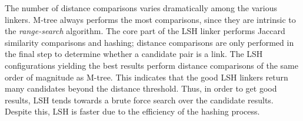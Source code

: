 \documentclass{llncs}
\begin{document}
The number of distance comparisons varies dramatically among the various
linkers. M-tree always performs the most comparisons, since they are
intrinsic to the \emph{range-search} algorithm. The core part of the LSH
linker performs Jaccard similarity comparisons and hashing; distance
comparisons are only performed in the final step to determine whether a
candidate pair is a link. The LSH configurations yielding the best
results perform distance comparisons of the same order of magnitude as
M-tree. This indicates that the good LSH linkers return many candidates
beyond the distance threshold. Thus, in order to get good results, LSH
tends towards a brute force search over the candidate results. Despite
this, LSH is faster due to the efficiency of the hashing process.

\end{document}
